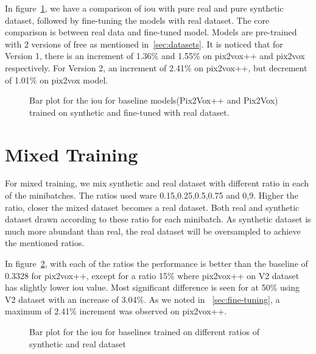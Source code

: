 In figure~\ref{fig:finetuning1}, we have a comparison of \gls{iou}  with pure real and pure synthetic dataset, followed by fine-tuning the models with real dataset.
The core comparison is between real data and fine-tuned model.
Models are pre-trained with 2 versions of \gls{free} as mentioned in~\ref{sec:datasets}.
It is noticed that for Version 1, there is an increment of 1.36\% and 1.55\% on pix2vox++ and pix2vox respectively.
For Version 2, an increment of 2.41\% on pix2vox++, but decrement of 1.01\% on pix2vox model.

\begin{figure}
    \centering
    \resizebox{\textwidth}{!}{}
    \caption{Bar plot for the \gls{iou}  for baseline models(Pix2Vox++ and Pix2Vox) trained on synthetic and fine-tuned with real dataset. }
    \label{fig:finetuning1}
\end{figure}

\section{Mixed Training}\label{sec:mixed-training}
For mixed training, we mix synthetic and real dataset with different ratio in each of the minibatches.
The ratios used ware 0.15,0.25,0.5,0.75 and 0,9.
Higher the ratio, closer the mixed dataset becomes a real dataset.
Both real and synthetic dataset drawn according to these ratio for each minibatch.
As synthetic dataset is much more abundant than real, the real dataset will be oversampled to achieve the mentioned ratios.

In figure~\ref{fig:mixed1}, with each of the ratios the performance is better than the baseline of 0.3328 for pix2vox++,
except for a ratio 15\% where pix2vox++ on V2 dataset has slightly lower \gls{iou}  value.
Most significant difference is seen for at 50\% using V2 dataset with an increase of 3.04\%.
As we noted in ~\ref{sec:fine-tuning}, a maximum of 2.41\% increment was observed on pix2vox++.


\begin{figure}
    \centering
    \resizebox{\textwidth}{!}{}
    \caption{Bar plot for the \gls{iou}  for baselines trained on different ratios of synthetic and real dataset}
    \label{fig:mixed1}
\end{figure}


